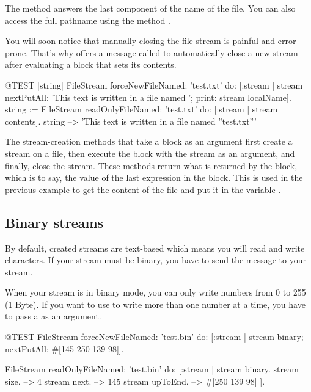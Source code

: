 \documentclass[a4paper,10pt,twoside]{book}
\begin{document}


The method  answers the last component of the name of the file.
You can also access the full pathname using the method .

You will soon notice that manually closing the file stream is painful and error-prone.
That's why  offers a message called  to automatically close a new stream after evaluating a block that sets its contents.

\begin{code}{@TEST |string|}
FileStream
    forceNewFileNamed: 'test.txt'
    do: [:stream |
        stream
            nextPutAll: 'This text is written in a file named ';
            print: stream localName].
string := FileStream
            readOnlyFileNamed: 'test.txt'
            do: [:stream | stream contents].
string --> 'This text is written in a file named ''test.txt'''
\end{code}

The stream-creation methods that take a block as an argument first create a stream on a file, then execute the block with the stream
as an argument, and finally, close the stream.
These methods return what is returned by the block, which is to say, the value of the last expression in the block.
This is used in the previous example to get the content of the file and put it in the variable .

\subsection{Binary streams}
\label{sec:binary-streams}

By default, created streams are text-based which means you will read and write characters.
If your stream must be binary, you have to send the message  to your stream.

When your stream is in binary mode, you can only write numbers from 0 to 255 (1 Byte).
If you want to use  to write more than one number at a time, you have to pass a  as an argument.

\begin{code}{@TEST}
FileStream
  forceNewFileNamed: 'test.bin'
  do: [:stream |
          stream
            binary;
            nextPutAll: #[145 250 139 98]].

FileStream
  readOnlyFileNamed: 'test.bin'
  do: [:stream |
          stream binary.
          stream size.         --> 4
          stream next.         --> 145
          stream upToEnd. --> #[250 139 98]
      ].
\end{code}
\end{document}
